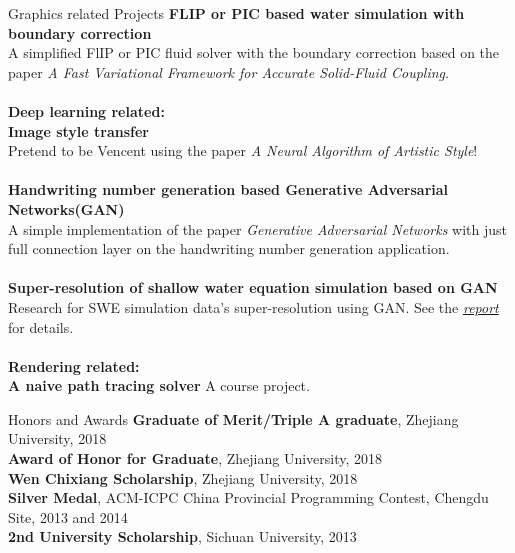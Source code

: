 \documentclass{resume} %
\makeatletter
\newcommand{\tabincell}[2]{\begin{tabular}{@{}#1@{}}#2\end{tabular}}
\makeatother
\begin{document}
\begin{rSection}{Graphics related Projects}
                {\bf FLIP or PIC based water simulation with boundary correction}\\A simplified FlIP or PIC fluid solver with the boundary correction based on the paper \emph{A Fast Variational Framework for Accurate Solid-Fluid Coupling}.\\\\
         \textbf{Deep learning related:}\\
                {\bf Image style transfer}\\Pretend to be Vencent using the paper \emph{A Neural Algorithm of Artistic Style}!\\\\
                {\bf Handwriting number generation based Generative Adversarial Networks(GAN)}\\ A simple implementation of the paper \emph{Generative Adversarial Networks} with just full connection layer on the handwriting number generation application.\\\\
                {\bf Super-resolution of shallow water equation simulation based on GAN}\\ Research for SWE simulation data's super-resolution using GAN. See the \emph{\href{https://wtyatzoo.github.io/report/SWE.pdf}{report}} for details.   \\\\
        \textbf{Rendering related:}\\
                {\bf A naive path tracing solver} A course project.
                
         
\end{rSection}

\begin{rSection}{Honors and Awards}
  \textbf{Graduate of Merit/Triple A graduate}, Zhejiang University, 2018\\
  \textbf{Award of Honor for Graduate}, Zhejiang University, 2018\\
  \textbf{Wen Chixiang Scholarship}, Zhejiang University, 2018\\
  \textbf{Silver Medal}, ACM-ICPC China Provincial Programming Contest, Chengdu Site, 2013 and 2014\\
  \textbf{2nd University Scholarship}, Sichuan University, 2013
\end{rSection}

{}
\end{document}
